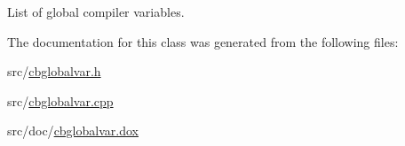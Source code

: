 List of global compiler variables. 



The documentation for this class was generated from the following files\-:\begin{DoxyCompactItemize}
\item 
src/\hyperlink{cbglobalvar_8h}{cbglobalvar.\-h}\item 
src/\hyperlink{cbglobalvar_8cpp}{cbglobalvar.\-cpp}\item 
src/doc/\hyperlink{cbglobalvar_8dox}{cbglobalvar.\-dox}\end{DoxyCompactItemize}
